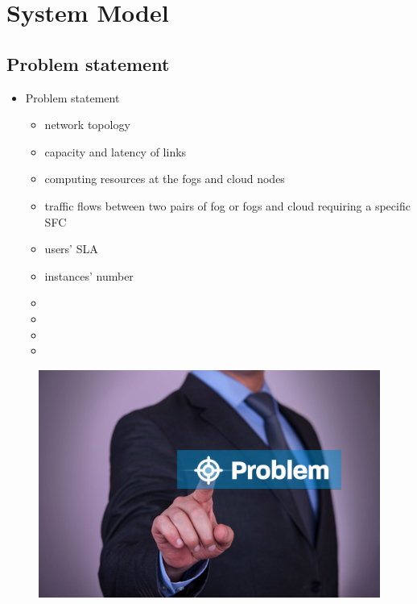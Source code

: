\documentclass{beamer}
\begin{document}
\section{System Model}
\subsection{Problem statement}
\begin{frame}
\begin{itemize}
	\item <1-> {Problem statement}
\begin{itemize}
	\item <1-> {network topology}
	\item <2-> {capacity and latency of links}
	\item <3-> {computing resources at the fogs and cloud nodes}
	\item <4-> {traffic
		flows between two pairs of fog or fogs and cloud requiring a
		specific SFC}
	\item <5-> {users’ SLA}	
	\item <6-> {instances’ number}
	\item <7-> \color{blue}{placement of VNFs}
	\item <8-> \color{blue}{corresponding traffic routing}
	\item <9-> \color{blue}{users’
		assignment to the SFC instances}
	\item <10-> \color{red}{minimize overall latency of
		network}
\end{itemize}
\end{itemize}
\begin{figure}	
	\includegraphics[width=0.3\linewidth]{problem_bullseye}
	\label{fig:problembullseye}
\end{figure}
\end{frame}
\end{document}
